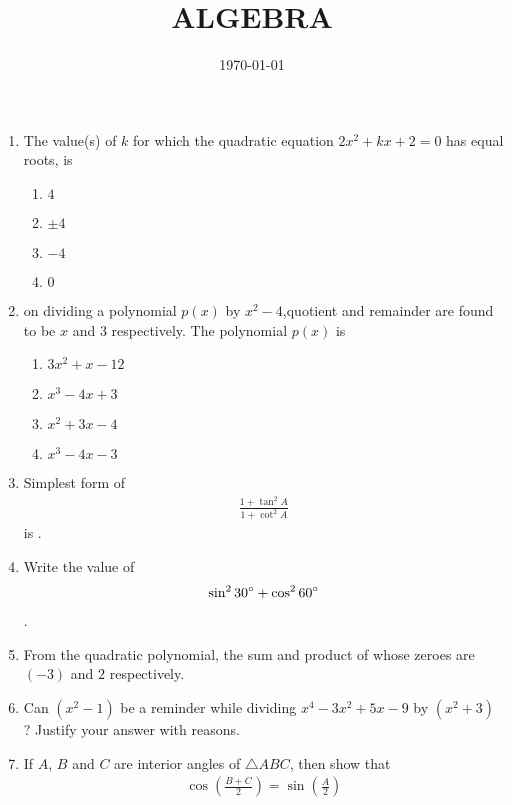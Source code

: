 \documentclass[12pt]{article}
\providecommand{\brak}[1]{\ensuremath{\left(#1\right)}}
\begin{document}
\title{ALGEBRA}
\date{ \today}
\maketitle
\begin{enumerate}

\item The value(s) of $k$ for which the quadratic equation $2x^2 + kx + 2 = 0$ has equal roots, is 
\begin{enumerate}[label =(\Alph*)]
\item $4$ 
\item $\pm 4$
\item $-4$
\item $0$ 
\end{enumerate}

\item on dividing a polynomial $p(x)$ by $x^2 - 4$,quotient and remainder are found to be $x$ and $3$ respectively. The polynomial $p(x)$ is 
\begin{enumerate}[label =(\Alph*)]
\item $3x^2 + x - 12$
\item $x^3 - 4x + 3$
\item $x^2 + 3x - 4$
\item $x^3 - 4x - 3$
\end{enumerate}

\item Simplest form of 
 \begin{align}
     \frac{1 + \tan^{2}{A}}{1 + \cot^{2}{A}}
 \end{align}is .

\item Write the value of
 \begin{align}
	     \sin^{2}{30\degree} + \cos^{2}{60\degree}
	\end{align}.
\item From the quadratic polynomial, the sum and product  of whose zeroes are $(-3)$ and $2$ respectively.

\item Can $\brak{x^{2} - 1}$ be a reminder while dividing $x^{4} - 3x^{2} + 5x - 9$ by 
$\brak{x^{2}+3}$ ? Justify your answer with reasons.

\item If $A$, $B$ and $C$ are interior angles of $ \triangle ABC$, then show that
	\begin{align}
	    \cos \brak{\frac{B + C}{2}}=\sin \brak{\frac{A}{2}}
	\end{align}
      

\end{enumerate}
\end{document}
